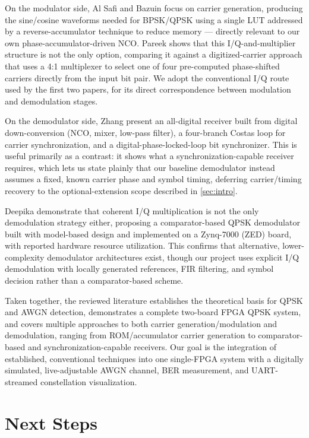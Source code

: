 \documentclass[10pt,twocolumn,letterpaper]{article}
\begin{document}
On the modulator side, Al Safi and Bazuin \cite{7777861}
focus on carrier generation, producing the sine/cosine waveforms
needed for BPSK/QPSK using a single LUT addressed by a
reverse-accumulator technique to reduce memory --- directly relevant
to our own phase-accumulator-driven NCO. Pareek \cite{7509346}
shows that this I/Q-and-multiplier structure is not the only option,
comparing it against a digitized-carrier approach that uses a 4:1
multiplexer to select one of four pre-computed phase-shifted carriers
directly from the input bit pair. We adopt the conventional I/Q route
used by the first two papers, for its direct correspondence between
modulation and demodulation stages.

On the demodulator side, Zhang \etal \cite{inproceedings} present an
all-digital receiver built from digital down-conversion (NCO, mixer,
low-pass filter), a four-branch Costas loop for carrier
synchronization, and a digital-phase-locked-loop bit synchronizer.
This is useful primarily as a contrast: it shows what a
synchronization-capable receiver requires, which lets us state plainly
that our baseline demodulator instead assumes a fixed, known carrier
phase and symbol timing, deferring carrier/timing recovery to the
optional-extension scope described in \cref{sec:intro}. 

Deepika \etal\cite{9019948} demonstrate that coherent I/Q multiplication is
not the only demodulation strategy either, proposing a comparator-based
QPSK demodulator built with model-based design and implemented on a
Zynq-7000 (ZED) board, with reported hardware resource utilization.
This confirms that alternative, lower-complexity demodulator
architectures exist, though our project uses explicit I/Q
demodulation with locally generated references, FIR filtering, and
symbol decision rather than a comparator-based scheme.

Taken together, the reviewed literature establishes the theoretical
basis for QPSK and AWGN detection, demonstrates a complete two-board
FPGA QPSK system, and covers multiple approaches to both carrier
generation/modulation and demodulation, ranging from ROM/accumulator
carrier generation to comparator-based and synchronization-capable
receivers. Our goal is the integration of established, conventional
techniques into one single-FPGA system with a digitally
simulated, live-adjustable AWGN channel, BER measurement, and
UART-streamed constellation visualization.


\section{Next Steps}
\label{sec:nextsteps}
\end{document}
